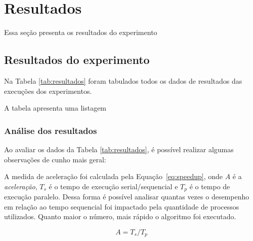 \chapter{Resultados}\label{cap:resultados}

Essa seção presenta os resultados do experimento \lipsum[11]

\section{Resultados do experimento}

\lipsum[12-13]

Na Tabela \ref{tab:resultados} foram tabulados todos os dados de resultados das execuções dos experimentos. 

A tabela apresenta uma listagem \lipsum[14]

\lipsum[15-17]

\subsection{Análise dos resultados}
Ao avaliar os dados da Tabela \ref{tab:resultados}, é possível realizar algumas observações de cunho mais geral:

\lipsum[18]


A medida de aceleração %
foi calculada pela Equação~\eqref{eq:speedup}, onde \(A\) é a \textit{aceleração}, \(T_s\) é o tempo de execução serial/sequencial e \(T_p\) é o tempo de execução paralelo. Dessa forma é possível analisar quantas vezes o desempenho em relação ao tempo sequencial foi impactado pela quantidade de processos utilizados. Quanto maior o número, mais rápido o algoritmo foi executado. 

\begin{equation} 
A = T_s / T_p
\label{eq:speedup}
\end{equation}


